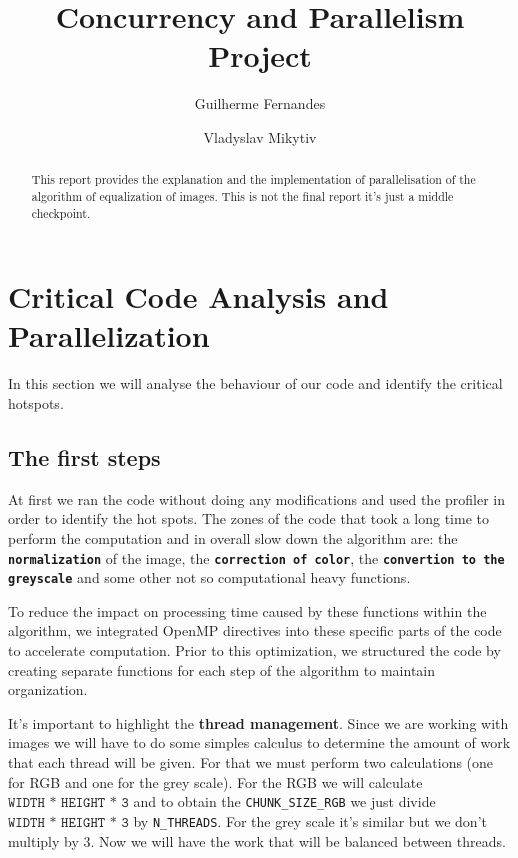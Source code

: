 \documentclass[sigconf]{acmart}
\begin{document}
\title{Concurrency and Parallelism Project}


\author{Guilherme Fernandes}

\author{Vladyslav Mikytiv}


\begin{abstract}
This report provides the explanation and the implementation of parallelisation of the algorithm of equalization of images. This is not the final report it's just a middle checkpoint.

\end{abstract}




\maketitle

\section{Critical Code Analysis and Parallelization}
In this section we will analyse the behaviour of our code and identify the critical hotspots.
\subsection{The first steps}

At first we ran the code without doing any modifications and used the profiler in order to identify the hot spots.
The zones of the code that took a long time to perform the computation and in overall slow down the algorithm are:
the \textbf{\texttt{normalization}} of the image, the \textbf{\texttt{correction of color}}, the \textbf{\texttt{convertion to the greyscale}} and some other
not so computational heavy functions. 

 To reduce the impact on processing time caused by these functions within the algorithm, we integrated OpenMP directives into these specific parts of the code to accelerate computation. Prior to this optimization, we structured the code by creating separate functions for each step of the algorithm to maintain organization.
 
 It's important to highlight the \textbf{thread management}. Since we are working with images we will have to do some simples calculus to determine the amount of work that
 each thread will be given. For that we must perform two calculations (one for RGB and one for the grey scale). For the RGB  we will calculate $\texttt{WIDTH * HEIGHT * 3}$ and to obtain the \texttt{CHUNK\_SIZE\_RGB} we just divide $\texttt{WIDTH * HEIGHT * 3}$  by \texttt{N\_THREADS}. For the grey scale it's similar but we don't multiply by 3. Now we will have the work that will be balanced between threads.
 
\end{document}
